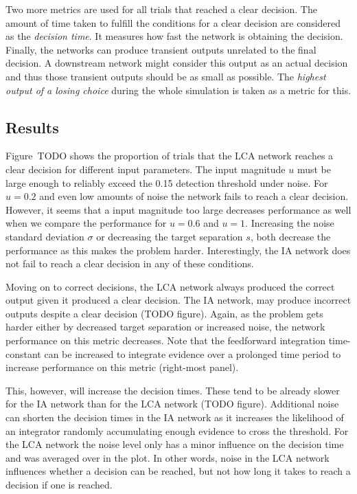 Two more metrics are used for all trials that reached a clear decision.
The amount of time taken to fulfill the conditions for a clear decision are considered as the \emph{decision time}.
It measures how fast the network is obtaining the decision.
Finally, the networks can produce transient outputs unrelated to the final decision.
A downstream network might consider this output as an actual decision and thus those transient outputs should be as small as possible.
The \emph{highest output of a losing choice} during the whole simulation is taken as a metric for this.


\subsection{Results}
Figure~TODO shows the proportion of trials that the LCA network reaches a clear decision for different input parameters.
The input magnitude $u$ must be large enough to reliably exceed the \num{0.15} detection threshold under noise.
For $u = 0.2$ and even low amounts of noise the network fails to reach a clear decision.
However, it seems that a input magnitude too large decreases performance as well when we compare the performance for $u=0.6$ and $u=1$.
Increasing the noise standard deviation $\sigma$ or decreasing the target separation $s$, both decrease the performance as this makes the problem harder.
Interestingly, the IA network does not fail to reach a clear decision in any of these conditions.

Moving on to correct decisions, the LCA network always produced the correct output given it produced a clear decision.
The IA network, may produce incorrect outputs despite a clear decision (TODO figure).
Again, as the problem gets harder either by decreased target separation or increased noise, the network performance on this metric decreases.
Note that the feedforward integration time-constant can be increased to integrate evidence over a prolonged time period  to increase performance on this metric (right-most panel).

This, however, will increase the decision times.
These tend to be already slower for the IA network than for the LCA network (TODO figure).
Additional noise can shorten the decision times in the IA network as it increases the likelihood of an integrator randomly accumulating enough evidence to cross the threshold.
For the LCA network the noise level only has a minor influence on the decision time and was averaged over in the plot.
In other words, noise in the LCA network influences whether a decision can be reached, but not how long it takes to reach a decision if one is reached.

